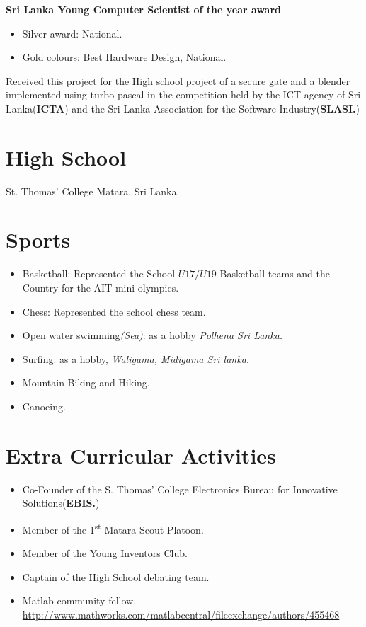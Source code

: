 \documentclass[margin]{res}
\begin{document}
\begin{resume}
{\bf Sri Lanka Young Computer Scientist of the year award}
\begin{itemize} \itemsep -2pt
  \item Silver award: National.
  \item Gold colours: Best Hardware Design, National.
\end{itemize}
Received this project for the High school project of a secure gate and a blender
implemented using turbo pascal in the competition held by the ICT agency of
Sri Lanka({\bf ICTA}) and the Sri Lanka Association for the Software
Industry({\bf SLASI.})

\section{High School} St. Thomas' College Matara, Sri Lanka.


\section{Sports}
\begin{itemize} \itemsep -2pt
  \item Basketball: Represented the School $U17/U19$ Basketball teams and the
  Country for the AIT mini olympics.
  \item Chess: Represented the school chess team.
  \item Open water swimming\textit{(Sea)}: as a hobby \textit{Polhena Sri
  Lanka.}
  \item Surfing: as a hobby, \textit{Waligama, Midigama Sri lanka.}
  \item Mountain Biking and Hiking.
  \item Canoeing.
\end{itemize}

\section{Extra Curricular Activities}
\begin{itemize} \itemsep -2pt
  \item Co-Founder of the S. Thomas' College Electronics Bureau for Innovative
  Solutions({\bf EBIS.})
  \item Member of the 1\textsuperscript{st} Matara Scout Platoon.
  \item Member of the Young Inventors Club.
  \item Captain of the High School debating team.
  \item Matlab\textsuperscript{\ssmall{\textregistered}} community fellow.
  \url{http://www.mathworks.com/matlabcentral/fileexchange/authors/455468}
\end{itemize}


\end{resume}
\end{document}
